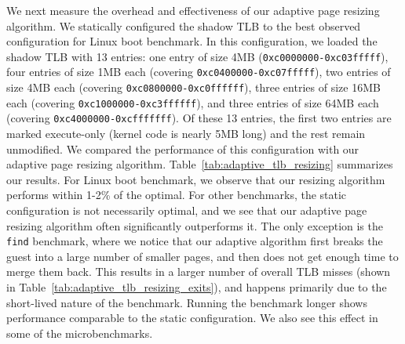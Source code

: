 \documentclass[10pt,twocolumn]{article}
\begin{document}
We next measure the overhead and effectiveness
of our adaptive page resizing algorithm. We statically configured the
shadow TLB to the best observed configuration for Linux boot benchmark.
In this configuration, we loaded the shadow TLB with 13 entries:
one entry of size 4MB ({\tt 0xc0000000-0xc03fffff}), four entries
of size 1MB each (covering {\tt 0xc0400000-0xc07fffff}), two entries
of size 4MB each (covering {\tt 0xc0800000-0xc0ffffff}),
three entries of size 16MB each (covering {\tt 0xc1000000-0xc3ffffff}),
and three entries of size 64MB each (covering {\tt 0xc4000000-0xcfffffff}).
Of these 13 entries, the first two entries are marked
execute-only (kernel code is nearly 5MB long) and the
rest remain unmodified.
We compared the performance of this configuration with our adaptive page
resizing algorithm.
Table~\ref{tab:adaptive_tlb_resizing} summarizes our results.
For Linux boot benchmark, we observe that our resizing algorithm performs
within 1-2\% of the optimal. For other benchmarks, the static configuration
is not necessarily optimal, and we see that our
adaptive page resizing algorithm often significantly outperforms it.
The only exception is the {\tt find} benchmark, where we notice that
our adaptive algorithm first breaks the guest into a large number
of smaller pages, and then does not get enough time to merge them back. This
results in a larger number of overall TLB misses (shown in
Table~\ref{tab:adaptive_tlb_resizing_exits}), and happens primarily due
to the short-lived nature of the benchmark. Running the benchmark longer shows
performance comparable to the static configuration. We also
see this effect in some of the microbenchmarks.
\end{document}
